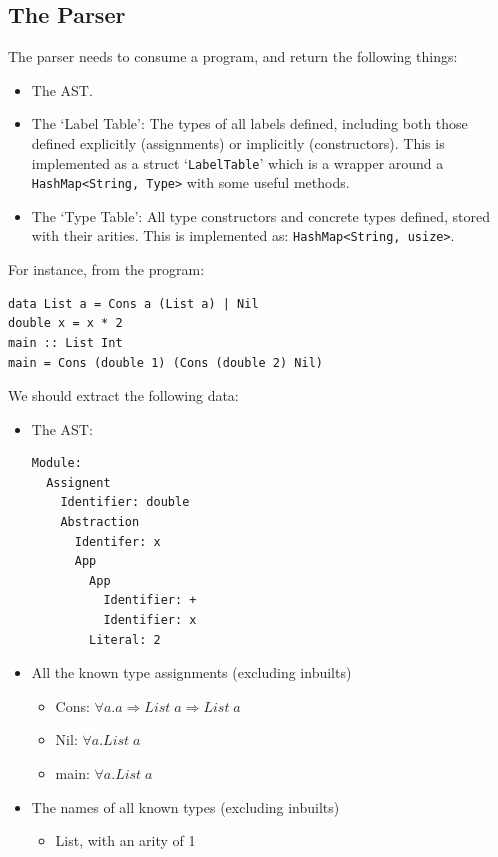 \subsection{The Parser}
The parser needs to consume a program, and return the following things:
\begin{itemize}
    \item The AST.
    \item The `Label Table': The types of all labels defined, including both those defined explicitly (assignments) or implicitly (constructors). This is implemented as a struct `\verb|LabelTable|' which is a wrapper around a \verb|HashMap<String, Type>| with some useful methods. 
    \item The `Type Table': All type constructors and concrete types defined, stored with their arities. This is implemented as: \verb|HashMap<String, usize>|.
\end{itemize}
For instance, from the program: 
\begin{lstlisting}[]
data List a = Cons a (List a) | Nil
double x = x * 2	
main :: List Int
main = Cons (double 1) (Cons (double 2) Nil)
\end{lstlisting}
We should extract the following data:
\begin{itemize}
    \item The AST: 
    \begin{lstlisting}[]
Module:
  Assignent
    Identifier: double
    Abstraction
      Identifer: x
      App
        App
          Identifier: +
          Identifier: x
        Literal: 2
    \end{lstlisting}
    \item All the known type assignments (excluding inbuilts)
        \begin{itemize}
            \item Cons: \(\forall a. a \Rightarrow List\;a\Rightarrow List\;a\)
            \item Nil: \(\forall a. List\;a\)
            \item main: \(\forall a. List\;a\)
        \end{itemize}
    \item The names of all known types (excluding inbuilts) 
        \begin{itemize}
            \item List, with an arity of 1
        \end{itemize}
\end{itemize}

